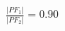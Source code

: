 \documentclass[preview]{standalone}
\begin{document}
\begin{align*}
\frac{|PF_1|}{|PF_2|} = 0.90
\end{align*}
\end{document}
